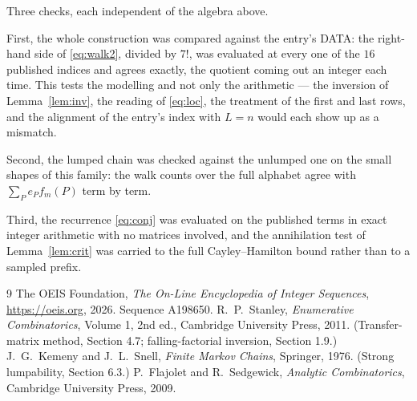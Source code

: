 \documentclass[11pt,a4paper]{article}
\theoremstyle{plain}
\theoremstyle{definition}
\begin{document}
Three checks, each independent of the algebra above.

First, the whole construction was compared against the entry's DATA: the right-hand side of
\eqref{eq:walk2}, divided by $7!$, was evaluated at every one of the $16$
published indices and agrees exactly, the quotient coming out an integer each time. This
tests the modelling and not only the arithmetic --- the inversion of Lemma~\ref{lem:inv},
the reading of \eqref{eq:loc}, the treatment of the first and last rows, and the
alignment of the entry's index with $L=n$ would each show up as a mismatch.

Second, the lumped chain was checked against the unlumped one on the small shapes of this
family: the walk counts over the full alphabet agree with $\sum_P e_Pf_m(P)$ term by term.

Third, the recurrence \eqref{eq:conj} was evaluated on the published terms in exact integer
arithmetic with no matrices involved, and the annihilation test of Lemma~\ref{lem:crit} was
carried to the full Cayley--Hamilton bound rather than to a sampled prefix.

\begin{thebibliography}{9}
 The OEIS Foundation, \emph{The On-Line Encyclopedia of Integer
Sequences}, \url{https://oeis.org}, 2026. Sequence A198650.
 R.~P.~Stanley, \emph{Enumerative Combinatorics}, Volume 1, 2nd ed.,
Cambridge University Press, 2011. (Transfer-matrix method, Section 4.7; falling-factorial
inversion, Section 1.9.)
 J.~G.~Kemeny and J.~L.~Snell, \emph{Finite Markov Chains}, Springer,
1976. (Strong lumpability, Section 6.3.)
 P.~Flajolet and R.~Sedgewick, \emph{Analytic Combinatorics}, Cambridge
University Press, 2009.
\end{thebibliography}
\end{document}
